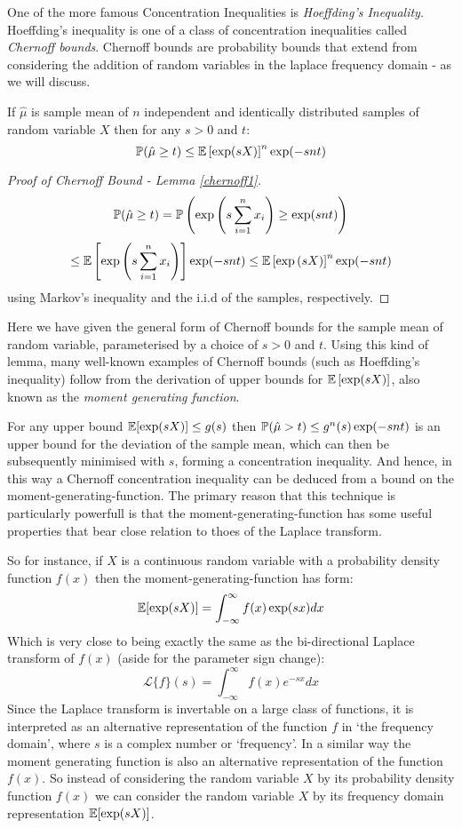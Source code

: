 One of the more famous Concentration Inequalities is \textit{Hoeffding's Inequality}.
Hoeffding's inequality is one of a class of concentration inequalities called \textit{Chernoff bounds}.
Chernoff bounds are probability bounds that extend from considering the addition of random variables in the laplace frequency domain - as we will discuss.

\begin{lemma}\label{chernoff1}
If $\hat{\mu}$ is sample mean of $n$ independent and identically distributed samples of random variable $X$ then for any $s>0$ and $t$:
\[ \operatorname{\mathbb{P}}(\hat{\mu}\ge t)\le\operatorname{\mathbb{E}}\left[\exp(sX)\right]^n\exp(-snt) \]
\end{lemma}
\begin{proof}[Proof of Chernoff Bound - Lemma \ref{chernoff1}]
$$\operatorname{\mathbb{P}}(\hat{\mu}\ge t) =  \operatorname{\mathbb{P}}\left(\exp\left(s\sum_{i=1}^nx_i\right)\ge \exp(snt)\right)$$
$$\le \operatorname{\mathbb{E}}\left[\exp\left(s\sum_{i=1}^nx_i\right)\right]\exp(-snt) \le \operatorname{\mathbb{E}}\left[\exp\left(sX\right)\right]^n\exp(-snt)
$$
using Markov's inequality and the i.i.d of the samples, respectively.
\end{proof}

Here we have given the general form of Chernoff bounds for the sample mean of random variable, parameterised by a choice of $s>0$ and $t$.
Using this kind of lemma, many well-known examples of Chernoff bounds (such as Hoeffding's inequality) follow from the derivation of upper bounds for $\operatorname{\mathbb{E}}\left[\exp(sX)\right]$, also known as the \textit{moment generating function}.

For any upper bound $\operatorname{\mathbb{E}}[\exp(sX)]\le g(s)$ then $\operatorname{\mathbb{P}}(\hat{\mu}>t)\le g^n(s)\exp(-snt)$ is an upper bound for the deviation of the sample mean, which can then be subsequently minimised with $s$, forming a concentration inequality.
And hence, in this way a Chernoff concentration inequality can be deduced from a bound on the moment-generating-function.
The primary reason that this technique is particularly powerfull is that the moment-generating-function has some useful properties that bear close relation to thoes of the Laplace transform.

So for instance, if $X$ is a continuous random variable with a probability density function $f(x)$ then the moment-generating-function has form:
$$ \operatorname{\mathbb{E}}[\exp(sX)] = \int_{-\infty}^\infty f(x)\exp(sx) dx $$
Which is very close to being exactly the same as the bi-directional Laplace transform of $f(x)$ (aside for the parameter sign change):
$$ \mathcal{L}\{f\}(s) = \int_{-\infty}^\infty f(x)e^{-sx} dx$$
Since the Laplace transform is invertable on a large class of functions, it is interpreted as an alternative representation of the function $f$ in `the frequency domain', where $s$ is a complex number or `frequency'.
In a similar way the moment generating function is also an alternative representation of the function $f(x)$.
So instead of considering the random variable $X$ by its probability density function $f(x)$ we can consider the random variable $X$ by its frequency domain representation $\operatorname{\mathbb{E}}[\exp(sX)]$.

